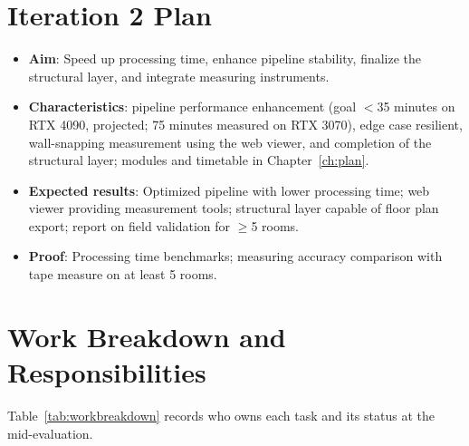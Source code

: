 \section{Iteration 2 Plan}
\begin{itemize}
    \item \textbf{Aim}: Speed up processing time, enhance pipeline stability, finalize the structural layer, and integrate measuring instruments.
    \item \textbf{Characteristics}: pipeline performance enhancement (goal $<$35 minutes on RTX 4090, projected; 75 minutes measured on RTX 3070), edge case resilient, wall-snapping measurement using the web viewer, and completion of the structural layer; modules and timetable in Chapter~\ref{ch:plan}.
    \item \textbf{Expected results}: Optimized pipeline with lower processing time; web viewer providing measurement tools; structural layer capable of floor plan export; report on field validation for $\geq$5 rooms.
    \item \textbf{Proof}: Processing time benchmarks; measuring accuracy comparison with tape measure on at least 5 rooms.
\end{itemize}

\section{Work Breakdown and Responsibilities}

Table~\ref{tab:workbreakdown} records who owns each task and its status at the mid-evaluation.

